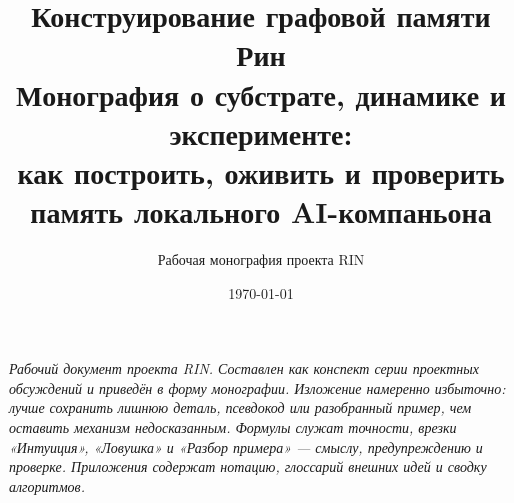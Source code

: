 \documentclass[11pt,a4paper]{extbook}
\title{Конструирование графовой памяти Рин\\[0.4em]
\large Монография о субстрате, динамике и эксперименте:\\
как построить, оживить и проверить память локального AI-компаньона}
\author{Рабочая монография проекта RIN}
\date{\today}
\theoremstyle{definition}
\begin{document}
\frontmatter
\maketitle

\vspace{1.5em}
\begin{center}
\begin{minipage}{0.82\textwidth}\itshape\small
Рабочий документ проекта RIN. Составлен как конспект серии проектных обсуждений и
приведён в форму монографии. Изложение намеренно избыточно: лучше сохранить лишнюю
деталь, псевдокод или разобранный пример, чем оставить механизм недосказанным.
Формулы служат точности, врезки «Интуиция», «Ловушка» и «Разбор примера» — смыслу,
предупреждению и проверке. Приложения содержат нотацию, глоссарий внешних идей и
сводку алгоритмов.
\end{minipage}
\end{center}
\vspace{1.5em}

\tableofcontents

\mainmatter





















\appendix







\backmatter

\end{document}
